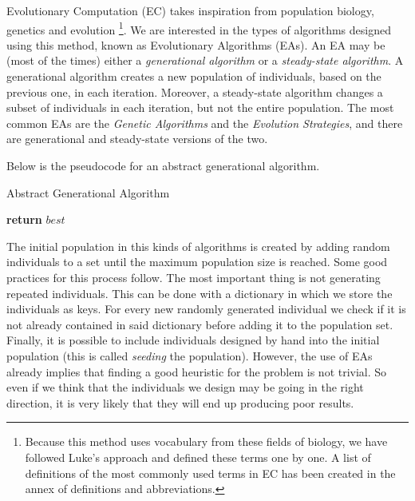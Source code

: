 Evolutionary Computation (EC) \cite{luke13metaheuristics} takes inspiration from population biology, genetics and evolution \footnote{Because this method uses vocabulary from these fields of biology, we have followed Luke's approach and defined these terms one by one. A list of definitions of the most commonly used terms in EC has been created in the annex of definitions and abbreviations.}. We are interested in the types of algorithms designed using this method, known as Evolutionary Algorithms (EAs). An EA may be (most of the times) either a \textit{generational algorithm} or a \textit{steady-state algorithm}.  A generational algorithm creates a new population of individuals, based on the previous one, in each iteration. Moreover, a steady-state algorithm changes a subset of individuals in each iteration, but not the entire population. The most common EAs are the \textit{Genetic Algorithms} and the \textit{Evolution Strategies}, and there are generational and steady-state versions of the two.

Below is the pseudocode for an abstract generational algorithm.

\begin{algorithm}[H]
    \caption{Abstract Generational Algorithm}
    \begin{algorithmic}[1]
                    \EndIf
                \EndFor
            \EndWhile
            \State \textbf{return} $best$
        \EndProcedure
    \end{algorithmic}
\end{algorithm}

The initial population in this kinds of algorithms is created by adding random individuals to a set until the maximum population size is reached. Some good practices for this process follow. The most important thing is not generating repeated individuals. This can be done with a dictionary in which we store the individuals as keys. For every new randomly generated individual we check if it is not already contained in said dictionary before adding it to the population set. Finally, it is possible to include individuals designed by hand into the initial population (this is called \textit{seeding} the population). However, the use of EAs already implies that finding a good heuristic for the problem is not trivial. So even if we think that the individuals we design may be going in the right direction, it is very likely that they will end up producing poor results.

